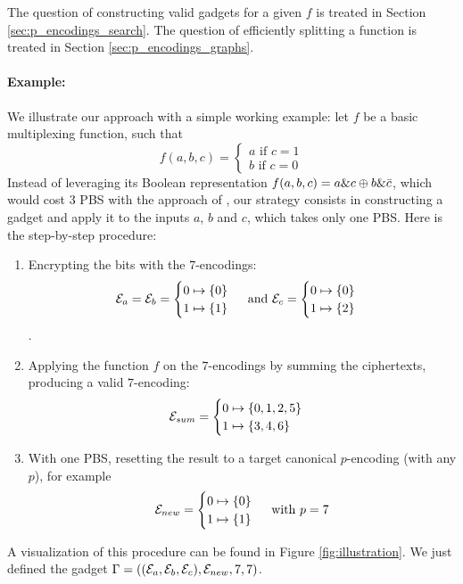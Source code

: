 The question of constructing valid gadgets for a given $f$ is treated in Section \ref{sec:p_encodings_search}. The question of efficiently splitting a function is treated in Section \ref{sec:p_encodings_graphs}.


\paragraph{Example:} We illustrate our approach with a simple working example: let $f$ be a basic multiplexing function, such that  $$
f(a, b, c) = \begin{cases}
    a \text{ if } c = 1\\
    b \text{ if } c = 0
\end{cases}
$$
Instead of leveraging its Boolean representation $f(a, b, c) = a \& c \oplus b \& \Bar{c}$, which would cost 3 \gls{PBS} with the approach of \cite{JC:CGGI20}, our strategy consists in constructing a gadget and apply it to the inputs $a$, $b$ and $c$, which takes only one \gls{PBS}. Here is the step-by-step procedure:

\begin{enumerate}
    \item Encrypting the bits with the $7$-encodings:\[\mathcal{E}_a = \mathcal{E}_b = \begin{cases} 0 \mapsto \{0\} \\ 1 \mapsto \{1\} \end{cases} \text{ and } \mathcal{E}_c = \begin{cases} 0 \mapsto \{0\} \\ 1 \mapsto \{2\} \end{cases}\].
    \item Applying the function $f$ on the $7$-encodings by summing the ciphertexts, producing a valid $7$-encoding:\[\mathcal{E}_{sum} = \begin{cases} 0 \mapsto \{0, 1, 2, 5\} \\ 1 \mapsto \{3, 4, 6\} \end{cases}\]
    \smallskip
    \item With one \gls{PBS}, resetting the result to a target canonical $p$-encoding (with any $p$), for example \[\mathcal{E}_{new} = \begin{cases} 0 \mapsto \{0\} \\ 1 \mapsto \{1\} \end{cases} \text{ with } p=7\]
\end{enumerate}

A visualization of this procedure can be found in Figure \ref{fig:illustration}. We just defined the gadget $\Gamma = \left ( (\mathcal{E}_a, \mathcal{E}_b, \mathcal{E}_c), \mathcal{E}_{new}, 7, 7\right )$.


